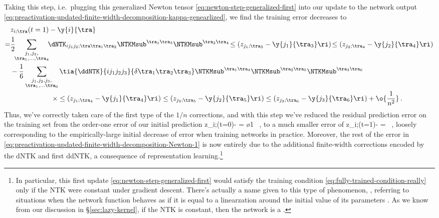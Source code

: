 Taking this step, i.e.~plugging this generalized Newton tensor \eqref{eq:newton-step-generalized-first} into our update to the network output \eqref{eq:preactivation-updated-finite-width-decomposition-kappa-genearlized}, we find the training error decreases to
\begin{align}\label{eq:preactivation-updated-finite-width-decomposition-Newton-1}
&z_{i;\tra}(t=1)-\y{i}{\tra}\, \\
=&\frac{1}{2}\!\!\sum_{\substack{j_1,j_2,\\ \tra_1,\ldots, \tra_4}}\!\!\dNTK_{i j_1j_2;\tra\tra_1\tra_2}\NTKMsub^{\tra_1\tra_3} \NTKMsub^{\tra_2\tra_4}\!\le(z_{j_1;\tra_3}-\y{j_1}{\tra_3}\ri)\!\le(z_{j_2;\tra_4}-\y{j_2}{\tra_4}\ri) \, \notag \\
&-\frac{1}{6}\sum_{\substack{j_1,j_2,j_3, \\ \tra_1,\ldots \tra_6} }\tia{\ddNTK}{i j_1j_2j_3}{\delta\tra_1\tra_2\tra_3}  
\NTKMsub^{\tra_1\tra_4}\NTKMsub^{\tra_2\tra_5}\NTKMsub^{\tra_3\tra_6} \, \notag \\
&\qquad\qquad\qquad\times \le(z_{j_1;\tra_4}-\y{j_1}{\tra_4}\ri)\le(z_{j_2;\tra_5}-\y{j_2}{\tra_5}\ri)\le(z_{j_3;\tra_6}-\y{j_3}{\tra_6}\ri)
+\o{\frac{1}{n^2}}\, .\notag
\end{align}
Thus, we've correctly taken care of the first type of the $1/n$ corrections, and
with this step we've reduced the residual prediction error on the training set
from the order-one error of our initial prediction 
\be
z_{i;\tra}(t=0)- = \o{1} \, ,
\ee
to a much smaller error of
\be\label{eq:one-step-error-factor-suppression}
z_{i;\tra}(t=1)- = \oninv \, ,
\ee
loosely corresponding to the empirically-large initial decrease of error when training networks in practice.
Moreover, the rest of the error in \eqref{eq:preactivation-updated-finite-width-decomposition-Newton-1} is now entirely due to
the additional finite-width corrections
encoded by the dNTK and first ddNTK, a consequence of representation learning.\footnote{
In particular, this first update \eqref{eq:newton-step-generalized-first} would satisfy the training condition \eqref{eq:fully-trained-condition-really} only if the NTK were constant under gradient descent.
There's actually a name given to this type of phenomenon, , referring to situations when the network function behaves as if it is equal to a linearzation around the initial value of its parameters \cite{chizat2018note}. As we know from our discussion in \S\ref{sec:lazy-kernel}, if the NTK is constant, then the network is a .
}

